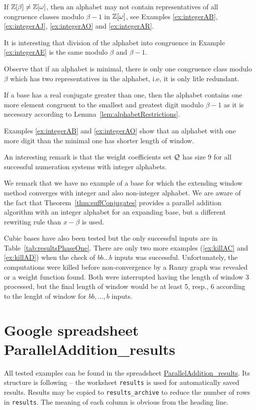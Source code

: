 If $\mathbb{Z}[\beta]\neq\mathbb{Z}[\omega]$, then an alphabet may not contain representatives of all congruence classes modulo $\beta-1$ in $\mathbb{Z}[\omega]$, see Examples \ref{ex:integerAB},  \ref{ex:integerAJ}, \ref{ex:integerAO} and \ref{ex:integerAR}.

It is interesting that division of the alphabet into congruence in Example \ref{ex:integerAE} is the same modulo $\beta$ and $\beta-1$.

Observe that if an alphabet is minimal, there is only one congruence class modulo $\beta$ which has two representatives in the alphabet, i.e, it is only litle  redundant.

If a base has a real conjugate greater than one, then the alphabet contains one more element congruent to the smallest and greatest digit modulo $\beta-1$ as it is necessary according to Lemma~\ref{lem:alphabetRestrictions}.

Examples \ref{ex:integerAB} and \ref{ex:integerAO} show that  an alphabet with one more digit than the minimal one has shorter length of window.

An interesting remark is that the weight coefficients set $\mathcal{Q}$ has size 9 for all successful numeration systems with integer alphabets.

We remark that we have no example of a base for which the extending window method converges with integer and also non-integer alphabet. We are aware of the fact that Theorem~\ref{thm:suffConjugates} provides a parallel addition algorithm with an integer alphabet for an expanding base, but  a different rewriting rule than $x-\beta$ is used.



Cubic bases have also been tested but the only successful inputs are in Table~\ref{tab:resultsPhaseOne}. There are only two more examples (\ref{ex:killAC} and \ref{ex:killAD}) when the check of $bb\dots b$ inputs was successful. Unfortunately, the computations were killed before non-convergence by a Rauzy graph was revealed or a weight function found. Both were interrupted having the length of window 3 processed, but the final length of window would be at least 5, resp., 6 according to the lenght of window for $bb,\dots,b$ inputs.








\section{Google spreadsheet ParallelAddition\_results}
\label{sec:gspreadsheet}
All tested examples can be found in the spreadsheet \href{https://docs.google.com/spreadsheets/d/1TnhrHdefHfHa0WSeVs4q6XVj3epjPlPlnoekE0E1xeM/edit?usp=sharing}{ParallelAddition\_results}. Its structure is following -- the worksheet \verb+results+ is used for automatically saved results. Results may be copied to \verb+results_archive+ to reduce the number of rows in \verb+results+. The meaning of each column is obvious from the heading line. 


